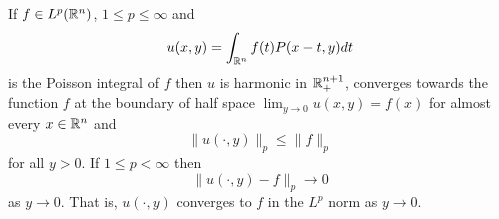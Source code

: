 \begin{theorem}\label{thm:21a}
    If $f\in L^p(\mathbb R^n)$, $1\leq p\leq\infty$ and
    \begin{equation*}
        u(x,y)=\int_{\mathbb R^n}f(t)P(x-t,y)dt
    \end{equation*}
    is the Poisson integral of $f$ then $u$ is harmonic in $\mathbb R_+^{n+1}$, converges towards the function $f$ at the boundary of half space $\lim_{y\rightarrow0}u(x,y)=f(x)$ for almost every $x\in\mathbb R^n$ and
    \begin{equation}\label{eq:lemma21a-ineq}
        \|u(\cdot,y)\|_p\leq\|f\|_p
    \end{equation}
    for all $y>0$. If $1\leq p<\infty$ then
    \begin{equation*}
        \|u(\cdot,y)-f\|_p\rightarrow0
    \end{equation*}
    as $y\rightarrow0$. That is, $u(\cdot,y)$ converges to $f$ in the $L^p$ norm as $y\rightarrow0$.
\end{theorem}
